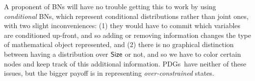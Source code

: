 \documentclass{article}
\newcommand{\MN}{PDG}
\newcommand{\MNs}{\MN s}
\numberwithin{equation}{section}
\begin{document}
\begin{example}
		\begin{vfull}
			A proponent of BNs will have no trouble getting this to work by using \emph{conditional} BNs, which represent conditional distributions rather than joint ones, with two slight inconveniences: (1) they would have to commit which variables are conditioned up-front, and so adding or removing information changes the type of mathematical object represented, and (2) there is no graphical distinction between having a distribution over $\sf Size$ or not, and so we have to color certain nodes and keep track of this additional information. \MNs\ have neither of these issues, but the bigger payoff is in representing \textit{over-constrained} states.
		\end{vfull}
	
	

\end{example}
\end{document}
